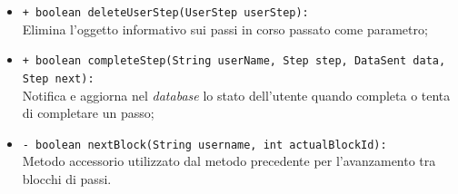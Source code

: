 \begin{flushleft}
\begin{itemize}
\begin{sloppypar}
\begin{itemize}
\item \texttt{+ boolean deleteUserStep(UserStep userStep):}\\ Elimina l'oggetto informativo sui passi in corso passato come parametro;
\item \texttt{+ boolean completeStep(String userName, Step step, DataSent data, Step next):}\\ Notifica e aggiorna nel \textit{database} lo stato dell'utente quando completa o tenta di completare un passo;
\item \texttt{- boolean nextBlock(String username, int actualBlockId):}\\ Metodo accessorio utilizzato dal  metodo precedente per l'avanzamento tra blocchi di passi.
\end{itemize}
\end{sloppypar}
\end{itemize}
\end{flushleft}

